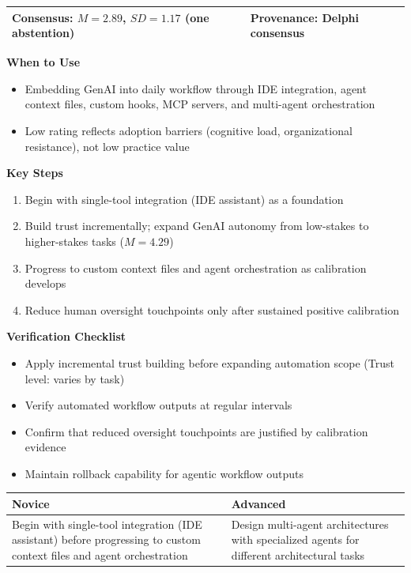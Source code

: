 \begin{tabular}{|p{7cm}|p{6cm}|}
    \hline
    \textbf{Consensus:} $M = 2.89$, $SD = 1.17$ (one abstention) & \textbf{Provenance:} Delphi consensus \\
    \hline
\end{tabular}

\vspace{0.5em}
\textbf{When to Use}
\begin{itemize}
    \item Embedding GenAI into daily workflow through IDE integration, agent context files, custom hooks, MCP servers, and multi-agent orchestration
    \item Low rating reflects adoption barriers (cognitive load, organizational resistance), not low practice value
\end{itemize}

\textbf{Key Steps}
\begin{enumerate}
    \item Begin with single-tool integration (IDE assistant) as a foundation
    \item Build trust incrementally; expand GenAI autonomy from low-stakes to higher-stakes tasks ($M = 4.29$)
    \item Progress to custom context files and agent orchestration as calibration develops
    \item Reduce human oversight touchpoints only after sustained positive calibration
\end{enumerate}

\textbf{Verification Checklist}
\begin{itemize}[label=\checkbox]
    \item Apply incremental trust building before expanding automation scope (Trust level: varies by task)
    \item Verify automated workflow outputs at regular intervals
    \item Confirm that reduced oversight touchpoints are justified by calibration evidence
    \item Maintain rollback capability for agentic workflow outputs
\end{itemize}

\begin{tabular}{|p{6.5cm}|p{6.5cm}|}
    \hline
    \textbf{Novice} & \textbf{Advanced} \\
    \hline
    Begin with single-tool integration (IDE assistant) before progressing to custom context files and agent orchestration & Design multi-agent architectures with specialized agents for different architectural tasks \\
    \hline
\end{tabular}


